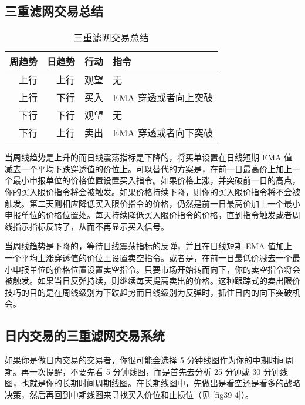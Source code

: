 \subsection*{三重滤网交易总结}
\begin{table}
    \centering
    \caption{三重滤网交易总结}
    \begin{tabular}{rrrl}
        \hline
        周趋势 & 日趋势 & 行动 & 指令           \\
        \hline
        上行  & 上行  & 观望 & 无            \\
        上行  & 下行  & 买入 & EMA 穿透或者向上突破 \\
        下行  & 下行  & 观望 & 无            \\
        下行  & 上行  & 卖出 & EMA 穿透或者向下突破 \\
        \hline
    \end{tabular}
\end{table}
当周线趋势是上升的而日线震荡指标是下降的，将买单设置在日线短期 EMA 值减去一个平均下跌穿透值的价位上。可以替代的方案是，在前一日最高价上加上一个最小申报单位的价格位置设置买入指令。如果价格上涨，并突破前一日的高点，你的买入限价指令将会被触发。如果价格持续下降，则你的买入限价指令将不会被触发。第二天则相应降低买入限价指令的价格，仍然是前一日最高价加上一个最小申报单位的价格位置处。每天持续降低买入限价指令的价格，直到指令触发或者周线指示指标反转了，从而不再显示买入信号。

当周线趋势是下降的，等待日线震荡指标的反弹，并且在日线短期 EMA 值加上一个平均上涨穿透值的价位上设置卖空指令。或者是，在前一日最低价减去一个最小申报单位的价格位置设置卖空指令。只要市场开始转而向下，你的卖空指令将会被触发。如果当日反弹持续，则继续每天提高卖出的价格。这种跟踪式的卖出限价技巧的目的是在周线级别为下跌趋势而日线级别为反弹时，抓住日内的向下突破机会。
\subsection*{日内交易的三重滤网交易系统}
如果你是做日内交易的交易者，你很可能会选择 5 分钟线图作为你的中期时间周期。再一次提醒，不要先看 5 分钟线图，而是首先去分析 25 分钟或 30 分钟线图，也就是你的长期时间周期线图。在长期线图中，先做出是看空还是看多的战略决策，然后再回到中期线图来寻找买入价位和止损位（见 \autoref{fig39-4}）。

